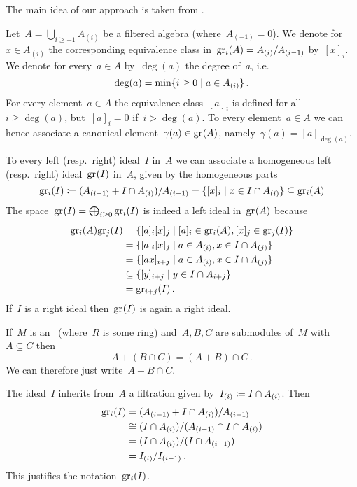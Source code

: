 \section{}

The main idea of our approach is taken from \cite[6.7]{noncommutative_noetherian}.

Let~$A = \bigcup_{i \geq -1} A_{(i)}$ be a filtered algebra (where~$A_{(-1)} = 0$).
We denote for~$x \in A_{(i)}$ the corresponding equivalence class in~$\gr[i](A) = A_{(i)} / A_{(i-1)}$ by~$[x]_i$.
We denote for every~$a \in A$ by~$\deg(a)$ the degree of~$a$, i.e.
\[
  \deg(a)
  =
  \min
  \{
    i \geq 0
  \suchthat
    a \in A_{(i)}
  \} \,.
\]
For every element~$a \in A$ the equivalence class~$[a]_i$ is defined for all~$i \geq \deg(a)$, but~$[a]_i = 0$ if~$i > \deg(a)$.
To every element~$a \in A$ we can hence associate a canonical element~$\gamma(a) \in \gr(A)$, namely~$\gamma(a) = [a]_{\deg(a)}$.

To every left (resp.\ right) ideal~$I$ in~$A$ we can associate a homogeneous left (resp.\ right) ideal~$\gr(I)$ in~$A$, given by the homogeneous parts
\[
  \gr[i](I)
  \defined
  ( A_{(i-1)} + I \cap A_{(i)} ) / A_{(i-1)}
  =
  \{
    [x]_i
  \suchthat
    x \in I \cap A_{(i)}
  \}
  \subseteq
  \gr[i](A)
\]
The space~$\gr(I) = \bigoplus_{i \geq 0} \gr[i](I)$ is indeed a left ideal in~$\gr(A)$ because
\begin{align*}
  \gr[i](A) \gr[j](I)
  &=
  \{
    [a]_i [x]_j
  \suchthat{}
    [a]_i \in \gr[i](A),
    [x]_j \in \gr[j](I)
  \}
  \\
  &=
  \{
    [a]_i [x]_j
  \suchthat
    a \in A_{(i)},
    x \in I \cap A_{(j)}
  \}
  \\
  &=
  \{
    [a x]_{i+j}
  \suchthat
    a \in A_{(i)},
    x \in I \cap A_{(j)}
  \}
  \\
  &\subseteq
  \{
    [y]_{i+j}
  \suchthat
    y \in I \cap A_{i+j}
  \}
  \\
  &=
  \gr[i+j](I) \,.
\end{align*}
If~$I$ is a right ideal then~$\gr(I)$ is again a right ideal.

\begin{recall}
  If~$M$ is an~{} (where~$R$ is some ring) and~$A, B, C$ are submodules of~$M$ with~$A \subseteq C$ then
  \[
    A + (B \cap C) = (A + B) \cap C \,.
  \]
  We can therefore just write~$A + B \cap C$.
\end{recall}

\begin{remark}
  The ideal~$I$ inherits from~$A$ a filtration given by~$I_{(i)} \coloneqq I \cap A_{(i)}$.
  Then
  \begin{align*}
    \gr[i](I)
    &=
    (A_{(i-1)} + I \cap A_{(i)}) / A_{(i-1)}
    \\
    &\cong
    (I \cap A_{(i)}) / (A_{(i-1)} \cap I \cap A_{(i)})
    \\
    &=
    (I \cap A_{(i)}) / (I \cap A_{(i-1)})
    \\
    &=
    I_{(i)} / I_{(i-1)} \,.
  \end{align*}
  This justifies the notation~$\gr[i](I)$.
\end{remark}

